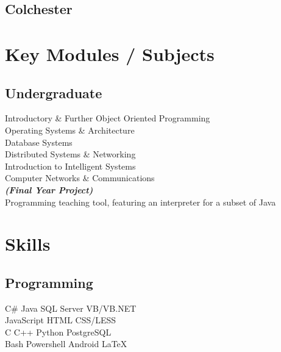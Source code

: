 \documentclass[a4paper]{deedy-resume} %
\newcommand{\Csh}{C{\lserif\#}}
\begin{document}
\begin{minipage}[t]{0.33\textwidth}
\subsection{Colchester}


\sectionspace %


\section{Key Modules / Subjects}

\subsection{Undergraduate}

Introductory \& Further Object Oriented Programming \\
Operating Systems \& Architecture \\
Database Systems \\
Distributed Systems \& Networking \\
Introduction to Intelligent Systems \\
Computer Networks \& Communications \\
{\footnotesize \textit{\textbf{(Final Year Project) }}} \\
Programming teaching tool, featuring an interpreter for a subset of Java

\sectionspace %


\section{Skills}

\subsection{Programming}

\Csh{} \textbullet{} Java \textbullet{} SQL Server \textbullet{} VB/VB.NET \\
JavaScript \textbullet{} HTML \textbullet{} CSS/LESS \\
C \textbullet{} C++ \textbullet{} Python \textbullet{} PostgreSQL \\
Bash \textbullet{} Powershell \textbullet{} Android \textbullet{} \LaTeX\
\sectionspace %


\end{minipage} %
\end{document}
